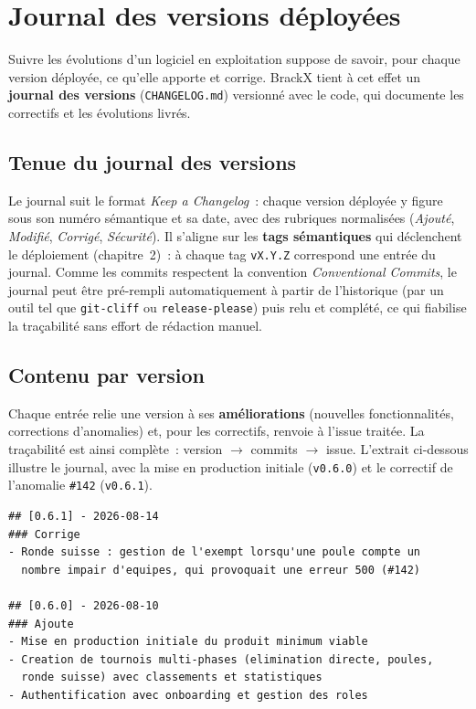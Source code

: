 \section{Journal des versions déployées}
\label{sec:journal-versions}

Suivre les évolutions d'un logiciel en exploitation suppose de savoir, pour chaque version déployée, ce qu'elle apporte et corrige. BrackX tient à cet effet un \textbf{journal des versions} (\texttt{CHANGELOG.md}) versionné avec le code, qui documente les correctifs et les évolutions livrés.

\subsection{Tenue du journal des versions}
Le journal suit le format \emph{Keep a Changelog}~: chaque version déployée y figure sous son numéro sémantique et sa date, avec des rubriques normalisées (\emph{Ajouté}, \emph{Modifié}, \emph{Corrigé}, \emph{Sécurité}). Il s'aligne sur les \textbf{tags sémantiques} qui déclenchent le déploiement (chapitre~2)~: à chaque tag \texttt{vX.Y.Z} correspond une entrée du journal. Comme les commits respectent la convention \emph{Conventional Commits}, le journal peut être pré-rempli automatiquement à partir de l'historique (par un outil tel que \texttt{git-cliff} ou \texttt{release-please}) puis relu et complété, ce qui fiabilise la traçabilité sans effort de rédaction manuel.

\subsection{Contenu par version}
Chaque entrée relie une version à ses \textbf{améliorations} (nouvelles fonctionnalités, corrections d'anomalies) et, pour les correctifs, renvoie à l'issue traitée. La traçabilité est ainsi complète~: version $\rightarrow$ commits $\rightarrow$ issue. L'extrait ci-dessous illustre le journal, avec la mise en production initiale (\texttt{v0.6.0}) et le correctif de l'anomalie \texttt{\#142} (\texttt{v0.6.1}).

\begin{lstlisting}[caption={Extrait du fichier \texttt{CHANGELOG.md}.},captionpos=b]
## [0.6.1] - 2026-08-14
### Corrige
- Ronde suisse : gestion de l'exempt lorsqu'une poule compte un
  nombre impair d'equipes, qui provoquait une erreur 500 (#142)

## [0.6.0] - 2026-08-10
### Ajoute
- Mise en production initiale du produit minimum viable
- Creation de tournois multi-phases (elimination directe, poules,
  ronde suisse) avec classements et statistiques
- Authentification avec onboarding et gestion des roles
\end{lstlisting}

